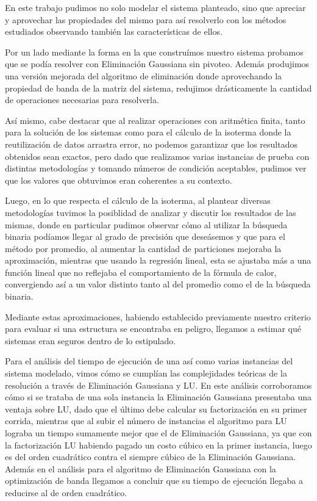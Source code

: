 \setlength{\parindent}{15.0pt} %
En este trabajo pudimos no solo modelar el sistema planteado, sino que
apreciar y aprovechar las propiedades del mismo para así resolverlo con los
métodos estudiados observando también las características de ellos.

Por un lado mediante la forma en la que construímos nuestro sistema probamos
que se podía resolver con Eliminación Gaussiana sin pivoteo. Además produjimos
una versión mejorada del algoritmo de eliminación donde aprovechando la
propiedad de banda de la matriz del sistema, redujimos drásticamente la
cantidad de operaciones necesarias para resolverla.

Así mismo, cabe destacar que al realizar operaciones con aritmética finita,
tanto para la solución de los sistemas como para el cálculo de la isoterma donde
 la reutilización de datos arrastra error, no podemos
garantizar que los resultados obtenidos sean exactos, pero dado que
realizamos varias instancias de prueba con distintas
metodologías y tomando números de condición aceptables, pudimos ver que los
valores que obtuvimos eran coherentes a su contexto.

Luego, en lo que respecta el cálculo de la isoterma, al plantear diversas
metodologías tuvimos la posiblidad de analizar y discutir los resultados de las
mismas, donde en particular pudimos observar cómo al utilizar la búsqueda
binaria podíamos llegar al grado de precisión que deseásemos y que para el
método por promedio, al aumentar la cantidad de particiones mejoraba la
aproximación, mientras que usando la regresión lineal, esta se ajustaba más a
una función lineal que no reflejaba el comportamiento de la fórmula de calor,
convergiendo así a un valor distinto tanto al del promedio como el de la
búsqueda binaria.

Mediante estas aproximaciones, habiendo establecido previamente nuestro
criterio para evaluar si una estructura se encontraba en peligro, llegamos a
estimar qué sistemas eran seguros dentro de lo estipulado.

Para el análisis del tiempo de ejecución de una así como
varias instancias del sistema modelado, vimos cómo se cumplían las complejidades
teóricas de la resolución a través de Eliminación Gaussiana y LU. En este
análisis corroboramos cómo si se trataba de una sola instancia la Eliminación
Gaussiana presentaba una ventaja sobre LU, dado que el último debe calcular su
factorización en su primer corrida, mientras que al subir el número de
instancias el algoritmo para LU lograba un tiempo sumamente mejor que el de
Eliminación Gaussiana, ya que con la factorización LU habiendo pagado un costo
cúbico en la primer instancia, luego es del orden cuadrático contra el
siempre cúbico de la Eliminación Gaussiana. Además en el análisis para el
algoritmo de Eliminación Gaussiana con la optimización de banda llegamos a
concluir que su tiempo de ejecución llegaba a reducirse al de orden cuadrático.

